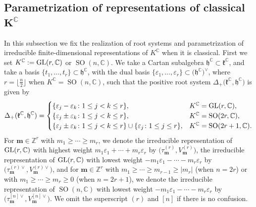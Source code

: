 \documentclass[pdftex]{sigma}
\numberwithin{equation}{section}
\newcommand{\bm}{\mathbf{m}}
\newcommand{\BZ}{\mathbb{Z}}
\newcommand{\BC}{\mathbb{C}}
\newcommand{\fh}{\mathfrak{h}}
\newcommand{\fk}{\mathfrak{k}}
\begin{document}
\subsection[Parametrization of representations of classical $K^\BC$]{Parametrization of representations of classical $\boldsymbol{K^\BC}$}
In this subsection we fix the realization of root systems and parametrization of irreducible finite-dimensional representations of $K^\BC$
when it is classical.
First we set $K^\BC:={\rm GL}(r,\BC)$ or $\operatorname{SO}(n,\BC)$. We take a Cartan subalgebra $\fh^\BC\subset\fk^\BC$,
and take a basis $\{t_1,\ldots,t_r\}\subset\fh^\BC$, with the dual basis $\{\varepsilon_1,\ldots,\varepsilon_r\}\subset\big(\fh^\BC\big)^\vee$,
where $r=\big\lfloor\frac{n}{2}\big\rfloor$ when $K^\BC=\operatorname{SO}(n,\BC)$, such that the positive root system $\Delta_+\big(\fk^\BC,\fh^\BC\big)$ is given by
\begin{gather*} \Delta_+(\fk^\BC,\fh^\BC)=\begin{cases}\{\varepsilon_j-\varepsilon_k\colon 1\le j<k\le r\},& K^\BC={\rm GL}(r,\BC) ,\\
\{\varepsilon_j\pm \varepsilon_k\colon 1\le j<k\le r\},& K^\BC=\operatorname{SO}(2r,\BC) ,\\
\{\varepsilon_j\pm \varepsilon_k\colon 1\le j<k\le r\}\cup\{\varepsilon_j\colon 1\le j\le r\},& K^\BC=\operatorname{SO}(2r+1,\BC) .\end{cases} \end{gather*}
For $\bm\in\BZ^r$ with $m_1\ge\cdots\ge m_r$, we denote
the irreducible representation of ${\rm GL}(r,\BC)$ with highest weight $m_1\varepsilon_1+\cdots+m_r\varepsilon_r$ by
$\big(\tau_\bm^{(r)},V_\bm^{(r)}\big)$,
the irreducible representation of ${\rm GL}(r,\BC)$ with lowest weight $-m_1\varepsilon_1-\cdots-m_r\varepsilon_r$ by
$\big(\tau_\bm^{(r)\vee},V_\bm^{(r)\vee}\big)$,
and for $\bm\in\BZ^r$ with $m_1\ge\cdots\ge m_{r-1}\ge|m_r|$ (when $n=2r$) or with $m_1\ge\cdots\ge m_r\ge 0$ (when $n=2r+1$), we denote
the irreducible representation of $\operatorname{SO}(n,\BC)$ with lowest weight $-m_1\varepsilon_1-\cdots-m_r\varepsilon_r$ by
$\big(\tau_\bm^{[n]\vee},V_\bm^{[n]\vee}\big)$.
We omit the superscript $(r)$ and $[n]$ if there is no confusion.
\end{document}
